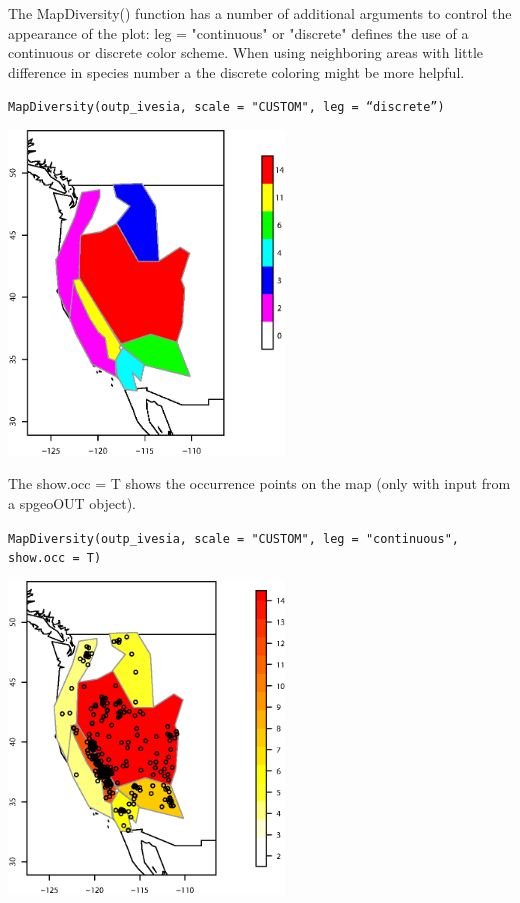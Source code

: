 \documentclass[a4paper,titlepage,11pt]{scrreprt}
\begin{document}
The MapDiversity() function has a number of additional arguments to control the appearance of the plot: leg = "continuous" or "discrete" defines the use of a continuous or discrete color scheme. When using neighboring areas with little difference in species number a the discrete coloring might be more helpful.

\texttt{MapDiversity(outp\_ivesia, scale = "CUSTOM", leg = ``discrete'')}\\
\begin{center}
\includegraphics[width=0.55\textwidth]{figures/mapdiversity_discrete.eps}\\
\end{center}

The show.occ = T shows the occurrence points on the map (only with input from a spgeoOUT object).

\texttt{MapDiversity(outp\_ivesia, scale = "CUSTOM", leg = "continuous", show.occ = T)}\\
\begin{center}
\includegraphics[width=0.55\textwidth]{figures/mapdiversity_points.eps}\\
\end{center}
\end{document}
